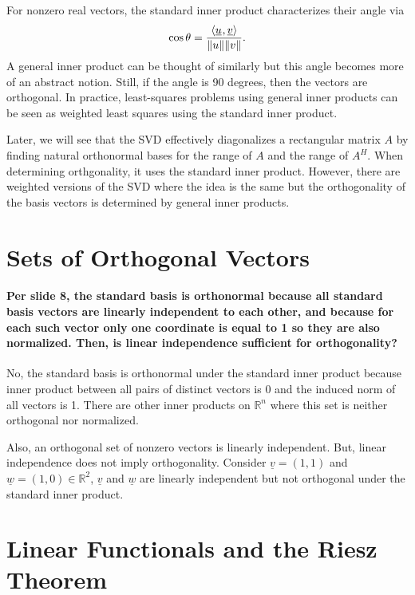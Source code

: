 \documentclass[10pt,english]{article}
\begin{document}
For nonzero real vectors, the standard inner product characterizes their angle via \[ \cos \theta = \frac{{\langle  \underline{u}  \mskip1mu ,  \underline{v}  \rangle}}{\|u\| \|v \|}. \]
A general inner product can be thought of similarly but this angle becomes more of an abstract notion.
Still, if the angle is 90 degrees, then the vectors are orthogonal.
In practice, least-squares problems using general inner products can be seen as weighted least squares using the standard inner product.

Later, we will see that the SVD effectively diagonalizes a rectangular matrix $A$ by finding natural orthonormal bases for the range of $A$ and the range of $A^H$.
When determining orthgonality, it uses the standard inner product.
However, there are weighted versions of the SVD where the idea is the same but the orthogonality of the basis vectors is determined by general inner products.


\section{Sets of Orthogonal Vectors}

\paragraph{Per slide 8, the standard basis is orthonormal because all standard basis vectors are linearly independent to each other, and because for each such vector only one coordinate is equal to 1 so they are also normalized. Then, is linear independence sufficient for orthogonality?}

No, the standard basis is orthonormal under the standard inner product because inner product between all pairs of distinct vectors is 0 and the induced norm of all vectors is 1.
There are other inner products on $\mathbb{R}^n$ where this set is neither orthogonal nor normalized.

Also, an orthogonal set of nonzero vectors is linearly independent.
But, linear independence does not imply orthogonality. Consider $\underline{v} = (1,1)$ and $\underline{w} = (1, 0) \in \mathbb{R}^2$, $\underline{v}$ and $\underline{w}$ are linearly independent but not orthogonal under the standard inner product.

\section{Linear Functionals and the Riesz Theorem}
\end{document}
